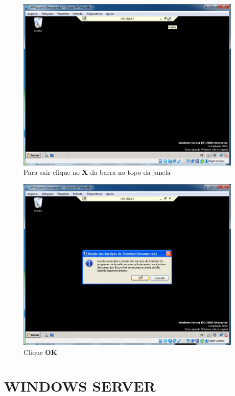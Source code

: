 \documentclass[10pt]{article}
\begin{document}
\begin{figure}[H]
    \centering
    \caption{Para sair clique no \textbf{X} da barra no topo da janela}
    \label{fig:ar027}
    \includegraphics[width=\linewidth]{images/acesso_remoto/ar027.png}
\end{figure}
\begin{figure}[H]
    \centering
    \caption{Clique \textbf{OK}}
    \label{fig:ar028}
    \includegraphics[width=\linewidth]{images/acesso_remoto/ar028.png}
\end{figure}


\section{WINDOWS SERVER}
\end{document}
